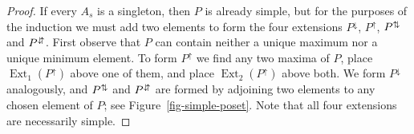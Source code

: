 \documentclass[11pt]{article}
\begin{document}
\begin{proof}
If every $A_s$ is a singleton, then $P$ is already simple, but for the purposes of the induction we must add two elements to form the four extensions $P^{\downarrow}$, $P^{\uparrow}$, $P^{{\uparrow\hspace{-2pt}\downarrow}}$ and $P^{{\downarrow\hspace{-2pt}\uparrow}}$. First observe that $P$ can contain neither a unique maximum nor a unique minimum element.  To form $P^\uparrow$ we find any two maxima of $P$, place ${\operatorname{Ext}}_1(P^\uparrow)$ above one of them, and place ${\operatorname{Ext}}_2(P^\uparrow)$ above both. We form $P^\downarrow$ analogously, and $P^{{\uparrow\hspace{-2pt}\downarrow}}$ and $P^{{\downarrow\hspace{-2pt}\uparrow}}$ are formed by adjoining two elements to any chosen element of $P$; see Figure~\ref{fig-simple-poset}. Note that all four extensions are necessarily simple.


\end{proof}
\end{document}
